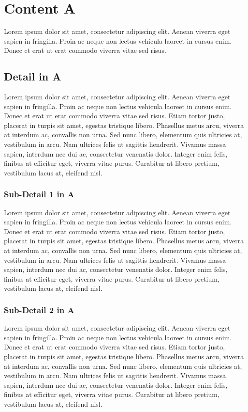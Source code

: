
\chapter{Content A}

Lorem ipsum dolor sit amet, consectetur adipiscing elit. Aenean viverra eget sapien in fringilla. Proin ac neque non lectus vehicula laoreet in cursus enim. Donec et erat ut erat commodo viverra vitae sed risus.

\section{Detail in A}

Lorem ipsum dolor sit amet, consectetur adipiscing elit. Aenean viverra eget sapien in fringilla. Proin ac neque non lectus vehicula laoreet in cursus enim. Donec et erat ut erat commodo viverra vitae sed risus. Etiam tortor justo, placerat in turpis sit amet, egestas tristique libero. Phasellus metus arcu, viverra at interdum ac, convallis non urna. Sed nunc libero, elementum quis ultricies at, vestibulum in arcu. Nam ultrices felis ut sagittis hendrerit. Vivamus massa sapien, interdum nec dui ac, consectetur venenatis dolor. Integer enim felis, finibus at efficitur eget, viverra vitae purus. Curabitur at libero pretium, vestibulum lacus at, eleifend nisl.

\subsection{Sub-Detail 1 in A}
Lorem ipsum dolor sit amet, consectetur adipiscing elit. Aenean viverra eget sapien in fringilla. Proin ac neque non lectus vehicula laoreet in cursus enim. Donec et erat ut erat commodo viverra vitae sed risus. Etiam tortor justo, placerat in turpis sit amet, egestas tristique libero. Phasellus metus arcu, viverra at interdum ac, convallis non urna. Sed nunc libero, elementum quis ultricies at, vestibulum in arcu. Nam ultrices felis ut sagittis hendrerit. Vivamus massa sapien, interdum nec dui ac, consectetur venenatis dolor. Integer enim felis, finibus at efficitur eget, viverra vitae purus. Curabitur at libero pretium, vestibulum lacus at, eleifend nisl.
\subsection{Sub-Detail 2 in A}
Lorem ipsum dolor sit amet, consectetur adipiscing elit. Aenean viverra eget sapien in fringilla. Proin ac neque non lectus vehicula laoreet in cursus enim. Donec et erat ut erat commodo viverra vitae sed risus. Etiam tortor justo, placerat in turpis sit amet, egestas tristique libero. Phasellus metus arcu, viverra at interdum ac, convallis non urna. Sed nunc libero, elementum quis ultricies at, vestibulum in arcu. Nam ultrices felis ut sagittis hendrerit. Vivamus massa sapien, interdum nec dui ac, consectetur venenatis dolor. Integer enim felis, finibus at efficitur eget, viverra vitae purus. Curabitur at libero pretium, vestibulum lacus at, eleifend nisl.
